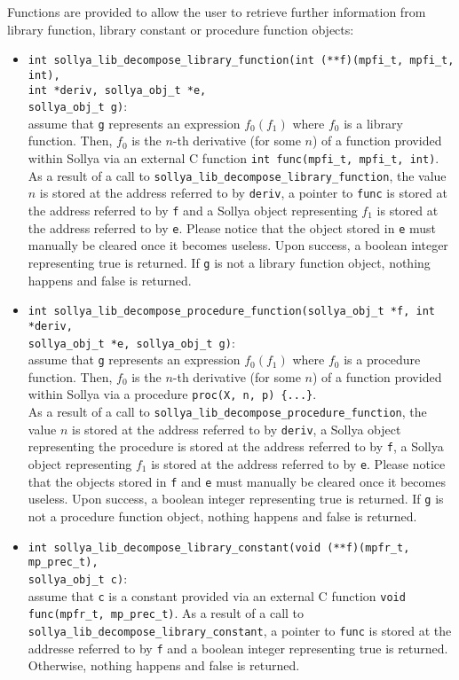 \documentclass[a4paper]{article}
\begin{document}
Functions are provided to allow the user to retrieve further information from library function, library constant or procedure function objects:
\begin{itemize}
\item \verb|int sollya_lib_decompose_library_function(int (**f)(mpfi_t, mpfi_t, int),|\\
\verb|int *deriv, sollya_obj_t *e,|\\
\verb|sollya_obj_t g)|:\\ assume that \verb|g| represents an expression $f_0(f_1)$ where $f_0$ is a library function. Then, $f_0$ is the $n$-th derivative (for some $n$) of a function provided within Sollya via an external C function \verb|int func(mpfi_t, mpfi_t, int)|.\\
As a result of a call to \verb|sollya_lib_decompose_library_function|, the value $n$ is stored at the address referred to by \verb|deriv|, a pointer to \verb|func| is stored at the address referred to by \verb|f| and a Sollya object representing $f_1$ is stored at the address referred to by \verb|e|. Please notice that the object stored in \verb|e| must manually be cleared once it becomes useless. Upon success, a boolean integer representing true is returned. If \verb|g| is not a library function object, nothing happens and false is returned.
\item \verb|int sollya_lib_decompose_procedure_function(sollya_obj_t *f, int *deriv,|\\
\verb|sollya_obj_t *e, sollya_obj_t g)|:\\
assume that \verb|g| represents an expression $f_0(f_1)$ where $f_0$ is a procedure function. Then, $f_0$ is the $n$-th derivative (for some $n$) of a function provided within Sollya via a procedure \verb|proc(X, n, p) {...}|.\\
As a result of a call to \verb|sollya_lib_decompose_procedure_function|, the value $n$ is stored at the address referred to by \verb|deriv|, a Sollya object representing the procedure is stored at the address referred to by \verb|f|, a Sollya object representing $f_1$ is stored at the address referred to by \verb|e|. Please notice that the objects stored in \verb|f| and \verb|e| must manually be cleared once it becomes useless. Upon success, a boolean integer representing true is returned. If \verb|g| is not a procedure function object, nothing happens and false is returned.
\item \verb|int sollya_lib_decompose_library_constant(void (**f)(mpfr_t, mp_prec_t),|\\
\verb|sollya_obj_t c)|:\\
assume that \verb|c| is a constant provided via an external C function \verb|void func(mpfr_t, mp_prec_t)|. As a result of a call to \verb|sollya_lib_decompose_library_constant|, a pointer to \verb|func| is stored at the addresse referred to by \verb|f| and a boolean integer representing true is returned. Otherwise, nothing happens and false is returned.
\end{itemize}
\end{document}
